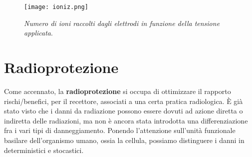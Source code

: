\documentclass{report}
\numberwithin{equation}{section}
\numberwithin{figure}{section}
\begin{document}
\begin{figure}[htp]
\centering
\texttt{[image: ioniz.png]}
\caption{\label{fig:ioniz} \textit{Numero di ioni raccolti dagli elettrodi in funzione della tensione applicata}.}
\end{figure}

\section{Radioprotezione}
Come accennato, la \textbf{radioprotezione} si occupa di ottimizzare il rapporto rischi/benefici, per il recettore, associati a una certa pratica radiologica. È già stato visto che i danni da radiazione possono essere dovuti ad azione diretta o indiretta delle radiazioni, ma non è ancora stata introdotta una differenziazione fra i vari tipi di danneggiamento. Ponendo l'attenzione sull'unità funzionale basilare dell'organismo umano, ossia la cellula, possiamo distinguere i danni in deterministici e stocastici.
\end{document}

